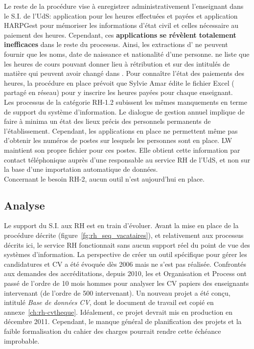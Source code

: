 \documentclass{book}
\begin{document}
Le reste de la procédure vise à enregistrer administrativement l'enseignant
dans le S.I. de l'UdS: application  pour les heures effectuées 
et payées et application HARPGest pour mémoriser les informations d'état civil 
et celles nécessaire au paiement des heures. 
Cependant, ces \textbf{applications se révèlent totalement inefficaces} dans 
le reste du processus. Ainsi, les extractions d' ne peuvent 
fournir que les noms, date de naissance et nationalité d'une personne. 
 ne liste que les heures de cours pouvant donner lieu à rétribution
et sur des intitulés de matière qui peuvent avoir changé dans .
Pour connaître l'état des paiements des heures, la procédure en place prévoit
que Sylvie Amar édite le fichier Excel (\index{\clecommun} partagé en réseau) 
pour y inscrire les heures payées pour chaque enseignant.\\

Les processus de la catégorie RH-1.2 subissent les mêmes manquements en terme
de support du système d'information. Le dialogue de gestion annuel implique
de faire à minima un état des lieux précis des personnels permanents de 
l'établissement. Cependant, les applications en place ne permettent même pas
d'obtenir les numéros de postes sur lesquels les personnes sont en place.
LW maintient son propre fichier pour ces postes. Elle obtient cette information
par contact téléphonique auprès d'une responsable au service RH de l'UdS, et
non sur la base d'une importation automatique de données.\\

Concernant le besoin RH-2, aucun outil n'est aujourd'hui en place.

\subsection{Analyse}
\label{sc:rh-analyse}
Le support du S.I. aux RH est en train d'évoluer. Avant la mise en place
de la procédure décrite (figure~\ref{fg:rh_seq_vacataires}), et relativement 
aux processus décrits ici, le service RH fonctionnait sans aucun support réel 
du point de vue des systèmes d'information. La perspective de créer un outil 
spécifique pour gérer les candidatures et CV a été évoquée dès 2006 mais ne 
s'est pas réalisée. 
Confrontés aux demandes des accréditations, depuis 2010, les \srh et
Organisation et Process ont passé de l'ordre de 10 mois hommes pour analyser 
les CV papiers des enseignants intervenant (de l'ordre de 500 intervenant). 
Un nouveau projet a été conçu, intitulé \textit{Base de données CV}, dont 
le document de travail est copié en annexe~\ref{ch:rh-cvtheque}.
Idéalement, ce projet devrait mis en production en décembre 2011. 
Cependant, le manque général de planification des projets et la faible 
formalisation du cahier des charges pourrait rendre cette échéance improbable.\\
\end{document}
